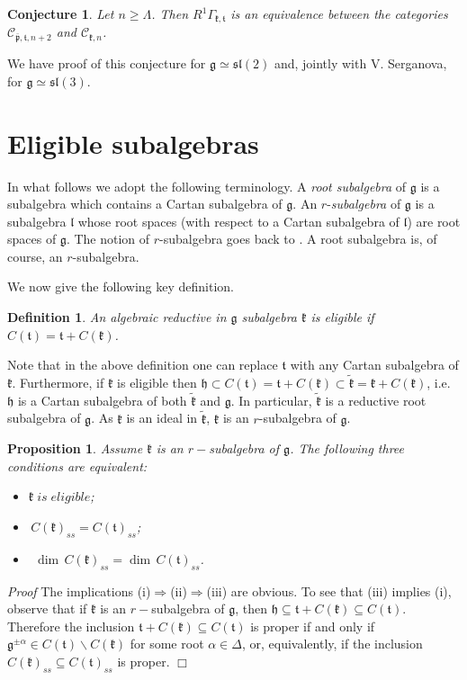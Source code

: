\documentclass[default]{./styles/svmult}
\newtheorem{prop}[theo]{Proposition}
\newtheorem{conject}[theo]{Conjecture}
\renewenvironment{proof}{ \emph{Proof}}{$\Box$}
\newtheorem{defi}[theo]{Definition}
\renewcommand{\gg}{\mathfrak{g}}
\newcommand{\hh}{\mathfrak{h}}
\newcommand{\kk}{\mathfrak{k}}
\renewcommand{\ll}{\mathfrak{l}}
\newcommand{\pp}{\mathfrak{p}}
\renewcommand{\tt}{\mathfrak{t}}
\renewcommand{\sl}{\mathfrak{sl}}
\begin{document}
\begin{conject}\label{conj:1} 
 Let $n \geq \Lambda$. Then $R^{1}\Gamma_{\kk,\tt}$ is an equivalence between the categories $\mathcal{C}_{\bar{\pp},\tt,n+2}$ and $\mathcal{C}_{\kk,n}$.
\end{conject}

 We have proof of this conjecture for $\gg \simeq \sl(2)$ and, jointly with V. Serganova, for $\gg \simeq \sl(3)$.

\section{Eligible subalgebras}\label{sect:4}

In what follows we adopt the following terminology. A \textit{root subalgebra} of $\gg$ is a subalgebra which contains a Cartan subalgebra of $\gg$. An $r$-\textit{subalgebra} of $\gg$ is a subalgebra $\ll$ whose root spaces (with respect to a Cartan subalgebra of $\ll$) are root spaces of $\gg$. The notion of $r$-subalgebra goes back to \cite{D}. A root subalgebra is, of course, an $r$-subalgebra.

We now give the following key definition.

\begin{defi}\label{def:2}
    An algebraic reductive in $\gg$ subalgebra $\kk$ is eligible if $C(\tt)=\tt+C(\kk)$.
\end{defi}

Note that in the above definition one can replace $\tt$ with any Cartan subalgebra of $\kk$. Furthermore, if $\kk$ is eligible then $\hh\subset C(\tt)=\tt+C(\kk)\subset\tilde{\kk}=\kk+C(\kk)$, i.e. $\hh$ is a Cartan subalgebra of both $\tilde{\kk}$ and $\gg$. In particular, $\tilde{\kk}$ is a reductive root subalgebra of $\gg$. As $\kk$ is an ideal in $\tilde{\kk}$, $\kk$ is an $r$-subalgebra of $\gg$.

\begin{prop}\label{prop:4}
 Assume $\kk$ is an $r-$subalgebra of $\gg$. The following three conditions are equivalent:
\begin{itemize}
  \item[(i)] $\kk\;is\;eligible$;
  \item[(ii)] $\,C(\kk)_{ss} = C(\tt)_{ss}$; 
  \item[(iii)] $\;\,\dim\,C(\kk)_{ss} = \dim\,C(\tt)_{ss}$.
\end{itemize}
\end{prop}

\begin{proof}
 The implications (i)$\Rightarrow$(ii)$\Rightarrow$(iii) are obvious. To see that (iii) implies (i), observe that if $\kk$ is an $r-$subalgebra of $\gg$, then $\hh \subseteq \tt + C(\kk) \subseteq C(\tt)$. Therefore the inclusion $\tt + C(\kk) \subseteq C(\tt)$ is proper if and only if $\gg^{\pm\alpha}\in C(\tt)\backslash C(\kk)$ for some root $\alpha \in \Delta$, or, equivalently, if the inclusion $C(\kk)_{ss} \subseteq C(\tt)_{ss}$ is proper.
\end{proof}
\end{document}
